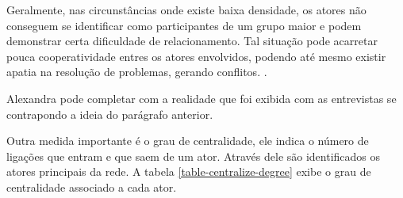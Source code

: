 Geralmente, nas circunstâncias onde existe baixa densidade, os atores não conseguem se identificar como participantes de um grupo maior e podem demonstrar certa dificuldade de relacionamento. Tal situação pode acarretar pouca cooperatividade entres os atores envolvidos, podendo até mesmo existir apatia na resolução de problemas, gerando conflitos. \cite{hanneman2001centralidad}.

Alexandra pode completar com a realidade que foi exibida com as entrevistas se contrapondo a ideia do parágrafo anterior.

Outra medida importante é o grau de centralidade, ele indica o número de ligações que entram e que saem de um ator. Através dele são identificados os atores principais da rede. A tabela \ref{table-centralize-degree} exibe o grau de centralidade associado a cada ator.

